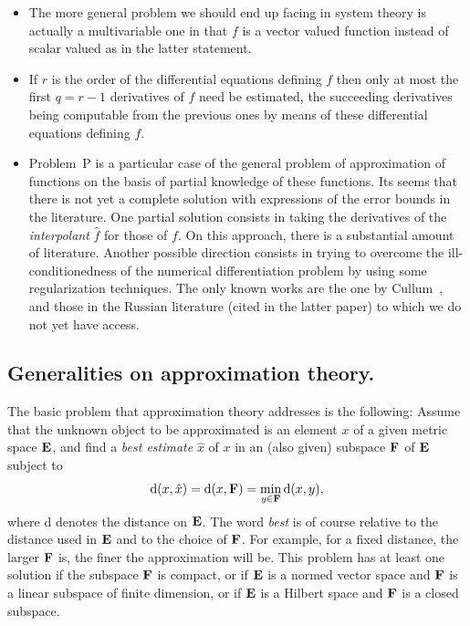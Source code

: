 \begin{itemize}

\item
The more general problem we should end up facing in system
theory is actually a multivariable one in that $f$ is a vector valued function
instead of scalar valued as in the latter statement.

\item
If $r$ is the order of the differential equations defining $f$ then only
at most the first $q = r - 1$ derivatives of $f$ need be estimated, the
succeeding derivatives being computable from the previous ones
by means of these differential equations defining $f$.

\item
Problem~P is a particular case of the general problem of approximation of
functions on the basis of partial knowledge of these functions.
Its seems that there is not yet a complete solution with
expressions of the error bounds in the literature.
One partial solution consists in taking the derivatives of the
{\it interpolant} $\hat f$ for those of $f$.
On this approach, there is a substantial amount of literature.
Another possible direction consists in trying to overcome
the ill-conditionedness of the numerical differentiation problem by using
some regularization techniques.
The only known works are the one by Cullum~\cite{cullum1971},
and those in the Russian literature (cited in the latter paper) to which we
do not yet have access.
\end{itemize}

\subsection{Generalities on approximation theory.}
The basic problem that approximation theory addresses is the following:
Assume that the unknown object to be approximated is an element
$x$ of a given metric space ${\bf E}$, and find a {\it best estimate}
$\hat x$ of $x$ in an (also given) subspace ${\bf F}$ of ${\bf E}$ subject to
$$
{\rm d}(x,\hat x) = {\rm d}(x,{\bf F}) = \min_{y \in {\bf F}}{\rm d}(x,y),
$$
where {\rm d} denotes the distance on ${\bf E}$.
The word {\it best} is of course relative to the distance used in
${\bf E}$ and to the choice of ${\bf F}$.
For example, for a fixed distance, the larger ${\bf F}$ is, the finer the
approximation will be.
This problem has at least one solution if the subspace
${\bf F}$ is compact, or if ${\bf E}$ is a normed vector
space and ${\bf F}$ is a linear subspace of finite dimension, or if ${\bf E}$
is a Hilbert space and ${\bf F}$ is a closed subspace.

